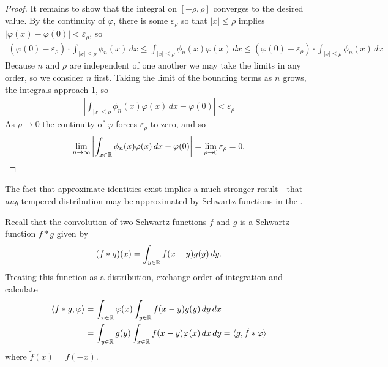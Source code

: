 \begin{proof}
      It remains to show that the integral on $[-\rho,\rho]$ converges to the desired value.
      By the continuity of $\varphi$, there is some $\varepsilon_\rho$ so that $|x|\le\rho$ implies $|\varphi(x)-\varphi(0)|<\varepsilon_\rho$, so
      \begin{align*}
        (\varphi(0)-\varepsilon_\rho)\cdot \int_{|x|\le\rho} \phi_n(x)\,dx
        \le \int_{|x|\le\rho} \phi_n(x)\varphi(x)\,dx
        \le (\varphi(0)+\varepsilon_\rho)\cdot \int_{|x|\le\rho} \phi_n(x)\, dx
      \end{align*}
      Because $n$ and $\rho$ are independent of one another we may take the limits in any order, so we consider $n$ first.
      Taking the limit of the bounding terms as $n$ grows, the integrals approach 1, so
      \begin{align*}
        \left| \int_{|x|\le\rho} \phi_n(x)\varphi(x)\,dx - \varphi(0) \right|
        < \varepsilon_\rho
      \end{align*}
      As $\rho\rightarrow0$ the continuity of $\varphi$ forces $\varepsilon_\rho$ to zero, and so
      \begin{align*}
        \lim_{n\rightarrow\infty} \left| \int_{x\in\mathbb{R}} \phi_n(x)\varphi(x)\,dx - \varphi(0) \right|
        = \lim_{\rho\rightarrow 0} \varepsilon_\rho
        = 0 \text{.}
      \end{align*}
    \end{proof}

    The fact that approximate identities exist implies a much stronger result---that \emph{any} tempered distribution may be approximated by Schwartz functions in the \ws.

    Recall that the convolution of two Schwartz functions $f$ and $g$ is a Schwartz function $f*g$ given by
    \begin{align*}
      (f*g)(x) = \int_{y\in\mathbb{R}} f(x-y)g(y)\,dy \text{.}
    \end{align*}
    Treating this function as a distribution, exchange order of integration and calculate
    \begin{align*}
      \langle f*g,\varphi\rangle
      &= \int_{x\in\mathbb{R}} \varphi(x) \int_{y\in\mathbb{R}} f(x-y)g(y)\,dy\,dx
      \\&= \int_{y\in\mathbb{R}} g(y) \int_{x\in\mathbb{R}} f(x-y)\varphi(x)\,dx\,dy
      = \langle g, \tilde f*\varphi\rangle
    \end{align*}
    where $\tilde f(x) = f(-x)$.


